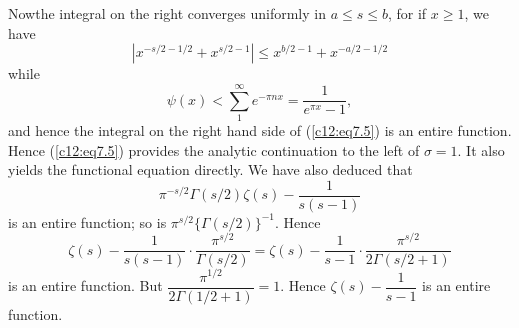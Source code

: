 Now\pageoriginale the integral on the right converges uniformly in $a
\leq s \leq b$, for if $x \geq 1$, we have
$$
\left|x^{-s/2-1/2} + x^{s/2-1} \right| \leq x ^{b/2-1} + x^{-a/2 -
  1/2} 
$$
while
$$
\psi (x) < \sum\limits^{\infty}_1 e^{-\pi n x} = \frac{1}{e^{\pi
    x}-1}, 
$$
and hence the integral on the right hand side of (\ref{c12:eq7.5}) is an entire
function. Hence (\ref{c12:eq7.5}) provides the analytic continuation to the left
of $\sigma =1$. It also yields the functional equation directly. We
have also deduced that
$$
\pi^{-s/2} \Gamma (s/2) \zeta(s) -\frac{1}{s(s-1)} 
$$
is an entire function; so is $\pi^{s/2} \{\Gamma(s/2)\}^{-1}$. Hence
$$
\zeta(s) - \frac{1}{s(s-1)} \cdot \frac{\pi^{s/2}}{\Gamma(s/2)} =
\zeta(s) - \frac{1}{s-1} \cdot \frac{\pi^{s/2}}{2 \Gamma(s/2 +1)}
$$
is an entire function. But $\dfrac{\pi^{1/2}}{2 \Gamma (1/2+1)}
=1$. Hence $\zeta(s) - \dfrac{1}{s-1}$ is an entire function.
